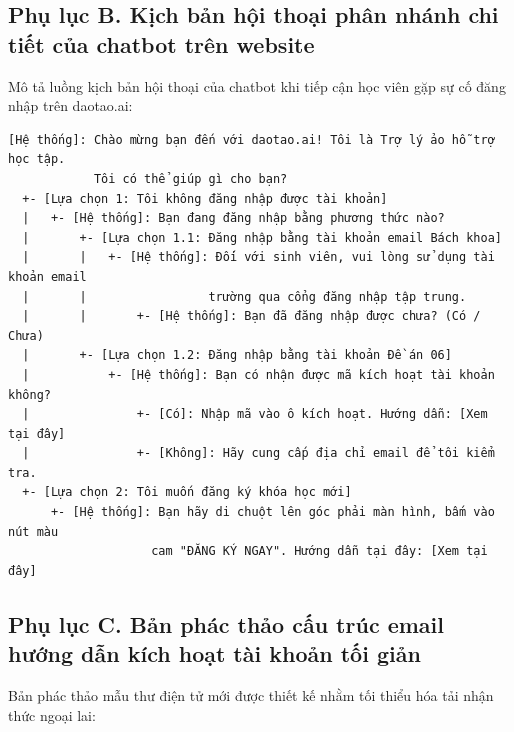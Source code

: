 \newpage

\subsection*{Phụ lục B. Kịch bản hội thoại phân nhánh chi tiết của chatbot trên website}

Mô tả luồng kịch bản hội thoại của chatbot khi tiếp cận học viên gặp sự cố đăng nhập trên daotao.ai:

\begingroup
\fontsize{9}{11}\selectfont
\begin{verbatim}
[Hệ thống]: Chào mừng bạn đến với daotao.ai! Tôi là Trợ lý ảo hỗ trợ học tập.
            Tôi có thể giúp gì cho bạn?
  +- [Lựa chọn 1: Tôi không đăng nhập được tài khoản]
  |   +- [Hệ thống]: Bạn đang đăng nhập bằng phương thức nào?
  |       +- [Lựa chọn 1.1: Đăng nhập bằng tài khoản email Bách khoa]
  |       |   +- [Hệ thống]: Đối với sinh viên, vui lòng sử dụng tài khoản email 
  |       |                 trường qua cổng đăng nhập tập trung.
  |       |       +- [Hệ thống]: Bạn đã đăng nhập được chưa? (Có / Chưa)
  |       +- [Lựa chọn 1.2: Đăng nhập bằng tài khoản Đề án 06]
  |           +- [Hệ thống]: Bạn có nhận được mã kích hoạt tài khoản không?
  |               +- [Có]: Nhập mã vào ô kích hoạt. Hướng dẫn: [Xem tại đây]
  |               +- [Không]: Hãy cung cấp địa chỉ email để tôi kiểm tra.
  +- [Lựa chọn 2: Tôi muốn đăng ký khóa học mới]
      +- [Hệ thống]: Bạn hãy di chuột lên góc phải màn hình, bấm vào nút màu 
                    cam "ĐĂNG KÝ NGAY". Hướng dẫn tại đây: [Xem tại đây]
\end{verbatim}
\endgroup

\subsection*{Phụ lục C. Bản phác thảo cấu trúc email hướng dẫn kích hoạt tài khoản tối giản}

Bản phác thảo mẫu thư điện tử mới được thiết kế nhằm tối thiểu hóa tải nhận thức ngoại lai:

